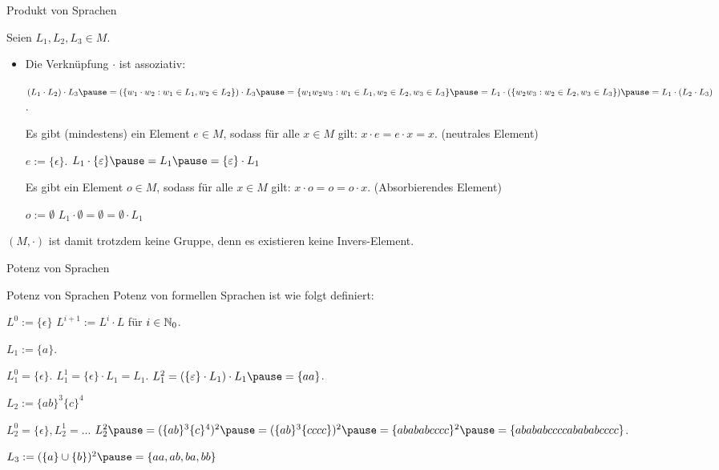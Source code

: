 \documentclass{beamer}
\begin{document}
\begin{frame}{Produkt von Sprachen}
	\pause 
	
	Seien $L_1, L_2, L_3 \in M$.
	
	\begin{itemize}
		\item Die Verknüpfung $\cdot$ ist assoziativ:
		\begin{itemize}
			\pitem $(L_1 \cdot L_2) \cdot L_3 \pause = (\{w_1\cdot w_2 : w_1 \in L_1, w_2 \in L_2\}) \cdot L_3 \pause = \{w_1w_2w_3 : w_1 \in L_1, w_2 \in L_2, w_3 \in L_3\} \pause = L_1 \cdot (\{w_2w_3 : w_2 \in L_2, w_3 \in L_3\}) \pause = L_1 \cdot (L_2 \cdot L_3)$.
		\end{itemize}
	
		\pitem Es gibt (mindestens) ein Element $e \in M$, sodass für alle $x \in M$ gilt: $x \cdot e = e \cdot x = x$. (neutrales Element)
		\begin{itemize}
			\pitem $e := \{\epsilon\}$.
			\pitem $L_1 \cdot \{\epsilon\} \pause = L_1 \pause = \{\epsilon\} \cdot L_1$
		\end{itemize}
	
		\pitem Es gibt ein Element $o \in M$, sodass für alle $x \in M$ gilt: $x \cdot o = o = o \cdot x$. (Absorbierendes Element)
		\begin{itemize}
			\pitem $o := \emptyset$
			\pitem $L_1 \cdot \emptyset = \emptyset = \emptyset \cdot L_1$
		\end{itemize}
	\end{itemize}

	$(M, \cdot)$ ist damit trotzdem keine Gruppe\p , denn es existieren keine Invers-Element.
\end{frame}

\begin{frame}{Potenz von Sprachen}
	
	\begin{block}{Potenz von Sprachen}
		Potenz von formellen Sprachen ist wie folgt definiert:
		\begin{itemize}
			\pitem $L^0 := \{\epsilon\}$
			\pitem $L^{i+1} := L^i \cdot L$ für $i \in \mathbb{N}_0$.
		\end{itemize}
	\end{block}

	\begin{itemize}
		\pitem $L_1 := \{a\}$.
		\begin{itemize}
			\pitem $L_1^0 = \{\epsilon\}$. \pause $L_1^1 = \{\epsilon\} \cdot L_1 = L_1$.
			\pitem $L_1^2 = (\{\epsilon\} \cdot L_1) \cdot L_1 \pause = \{aa\}$.
		\end{itemize}
		\pitem $L_2 := \{ab\}^3\{c\}^4$
		\begin{itemize}
			\pitem $L_2^0 = \{\epsilon\}, L_2^1 = ...$
			\pitem $L_2^2 \pause = (\{ab\}^3\{c\}^4)^2 \pause = (\{ab\}^3\{cccc\})^2 \pause = \{abababcccc\}^2 \pause = \{abababccccabababcccc\}$.
		\end{itemize}
		\pitem $L_3 := (\{a\} \cup \{b\})^2 \pause = \{aa, ab, ba, bb\}$
	\end{itemize}

\end{frame}
\end{document}
